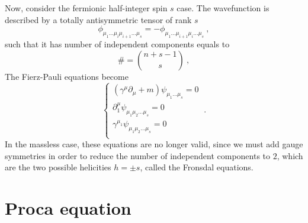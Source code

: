     Now, consider the fermionic half-integer spin $s$ case. The wavefunction is described by a totally antisymmetric tensor of rank $s$ 
    \begin{equation*}
        \phi_{\mu_1 \ldots \mu_i \mu_{i+1} \ldots \mu_s} = - \phi_{\mu_1 \ldots \mu_{i+1} \mu_i \ldots \mu_s} ~,
    \end{equation*}
    such that it has number of independent components equals to
    \begin{equation}\label{comp}
        \# = \binom{n+s-1}{s} ~,
    \end{equation}
    The Fierz-Pauli equations become 
    \begin{equation*}
        \begin{cases}
            (\gamma^\mu \partial_\mu + m) \psi_{\mu_1 \ldots \mu_s} = 0 \\
            \partial^\mu_1 \psi_{\mu_1 \mu_2 \ldots \mu_s} = 0 \\
            \gamma^{\mu_1} \psi_{\mu_1 \mu_2 \ldots \mu_s} = 0 \\
        \end{cases} ~.
    \end{equation*}
    In the massless case, these equations are no longer valid, since we must add gauge symmetries in order to reduce the number of independent components to $2$, which are the two possible helicities $h = \pm s$, called the Fronsdal equations.

\section{Proca equation}

